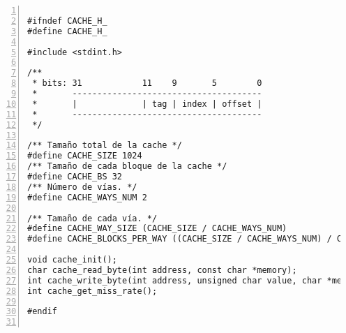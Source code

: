 \documentclass[11pt,a4paper, spanish]{article}
\begin{document}
\begin{lstlisting}[numbers=left, tabsize=2, basicstyle=\fontsize{11}{13}\ttfamily, frame=single, caption={makefile}]

#ifndef CACHE_H_
#define CACHE_H_

#include <stdint.h>

/**
 * bits: 31            11    9       5        0
 *       --------------------------------------
 *       |             | tag | index | offset |
 *       --------------------------------------
 */

/** Tamaño total de la cache */
#define CACHE_SIZE 1024
/** Tamaño de cada bloque de la cache */
#define CACHE_BS 32
/** Número de vías. */
#define CACHE_WAYS_NUM 2

/** Tamaño de cada vía. */
#define CACHE_WAY_SIZE (CACHE_SIZE / CACHE_WAYS_NUM)
#define CACHE_BLOCKS_PER_WAY ((CACHE_SIZE / CACHE_WAYS_NUM) / CACHE_BS)

void cache_init();
char cache_read_byte(int address, const char *memory);
int cache_write_byte(int address, unsigned char value, char *memory);
int cache_get_miss_rate();

#endif


\end{lstlisting}
\end{document}

